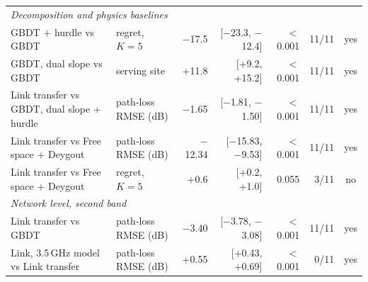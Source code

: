 \begin{tabular}{llrrrrc}
\multicolumn{7}{l}{\emph{Decomposition and physics baselines}} \\
GBDT + hurdle vs GBDT & regret, $K{=}5$ & \ensuremath{-}17.5 & [\ensuremath{-}23.3, \ensuremath{-}12.4] & $<$0.001 & 11/11 & yes \\
GBDT, dual slope vs GBDT & serving site & +11.8 & [+9.2, +15.2] & $<$0.001 & 11/11 & yes \\
Link transfer vs GBDT, dual slope + hurdle & path-loss RMSE (dB) & \ensuremath{-}1.65 & [\ensuremath{-}1.81, \ensuremath{-}1.50] & $<$0.001 & 11/11 & yes \\
Link transfer vs Free space + Deygout & path-loss RMSE (dB) & \ensuremath{-}12.34 & [\ensuremath{-}15.83, \ensuremath{-}9.53] & $<$0.001 & 11/11 & yes \\
Link transfer vs Free space + Deygout & regret, $K{=}5$ & +0.6 & [+0.2, +1.0] & 0.055 & 3/11 & no \\
\multicolumn{7}{l}{\emph{Network level, second band}} \\
Link transfer vs GBDT & path-loss RMSE (dB) & \ensuremath{-}3.40 & [\ensuremath{-}3.78, \ensuremath{-}3.08] & $<$0.001 & 11/11 & yes \\
Link, 3.5\,GHz model vs Link transfer & path-loss RMSE (dB) & +0.55 & [+0.43, +0.69] & $<$0.001 & 0/11 & yes \\
\bottomrule
\end{tabular}
